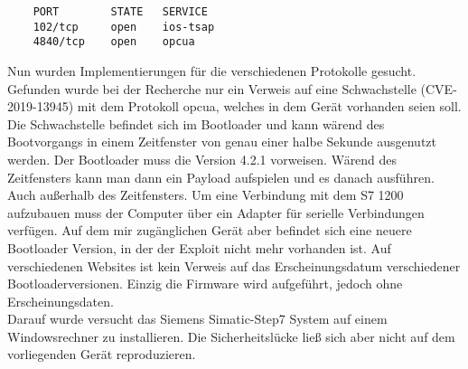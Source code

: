 \begin{verbatim}
	PORT 		STATE 	SERVICE
	102/tcp 	open	ios-tsap
	4840/tcp 	open	opcua
\end{verbatim}






\noindent Nun wurden Implementierungen für die verschiedenen Protokolle gesucht.
Gefunden wurde bei der Recherche nur ein Verweis auf eine Schwachstelle (CVE-2019-13945) mit dem Protokoll opcua, welches in dem Gerät vorhanden seien soll.
Die Schwachstelle befindet sich im Bootloader und kann wärend des Bootvorgangs in einem Zeitfenster von genau einer halbe Sekunde 
ausgenutzt werden. Der Bootloader muss die Version 4.2.1 vorweisen. Wärend des Zeitfensters kann man dann ein Payload aufspielen und es danach ausführen. 
Auch außerhalb des Zeitfensters. 
Um eine Verbindung mit dem S7 1200 aufzubauen muss der Computer über ein Adapter für serielle Verbindungen verfügen.
Auf dem mir zugänglichen Gerät aber befindet sich eine neuere Bootloader Version, in der der Exploit nicht mehr vorhanden ist.
Auf verschiedenen Websites ist kein Verweis auf das Erscheinungsdatum verschiedener Bootloaderversionen. Einzig die Firmware wird aufgeführt, 
jedoch ohne Erscheinungsdaten.\\
Darauf wurde versucht das Siemens Simatic-Step7 System auf einem Windowsrechner zu installieren. 
Die Sicherheitslücke ließ sich aber nicht auf dem vorliegenden Gerät reproduzieren.


